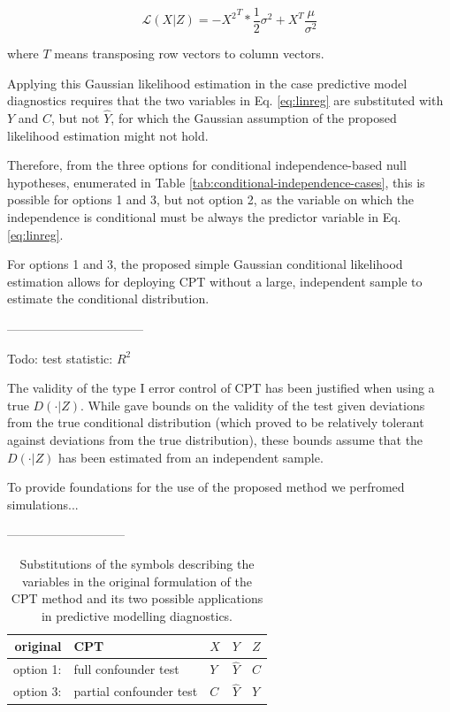 \documentclass{article}
\begin{document}
$$ \mathcal{L}(X|Z) = -{X^2}^T * \frac{1}{2} \sigma^2 + X^T \frac{\mu}{\sigma^2}$$

where $T$ means transposing row vectors to column vectors. 

Applying this Gaussian likelihood estimation in the case predictive model diagnostics requires that the two variables in Eq. \ref{eq:linreg} are substituted with $Y$ and $C$, but not $\hat{Y}$, for which the Gaussian assumption of the proposed likelihood estimation might not hold.

Therefore, from the three options for conditional independence-based null hypotheses, enumerated in Table \ref{tab:conditional-independence-cases}, this is possible for options 1 and 3, but not option 2, as the variable on which the independence is conditional must be always the predictor variable in Eq. \ref{eq:linreg}.

For options 1 and 3, the proposed simple Gaussian conditional likelihood estimation allows for deploying CPT without a large, independent sample to estimate the conditional distribution. 

---------------------------------


Todo: test statistic: $R^2$

The validity of the type I error control of CPT has been justified when using a true $D(\cdot|Z)$. While \cite{berrett2020conditional} gave bounds on the validity of the test given deviations from the true conditional distribution (which proved to be relatively tolerant against deviations from the true distribution), these bounds assume that the $D(\cdot|Z)$ has been estimated from an independent sample.

To provide foundations for the use of the proposed method we perfromed simulations...


-----------------------------

\renewcommand{\arraystretch}{2}
\begin{table}[]
\centering
\begin{tabular}{rl|l|l|l}
original & CPT & $X$ & $Y$ & $Z$ \\
\hline
option 1: & full confounder test & $Y$ & $\hat{Y}$ & $C$ \\
option 3: & partial confounder test & $C$ & $\hat{Y}$ & $Y$ \\
\end{tabular}
\caption{\label{tab:substitution} Substitutions of the symbols describing the variables in the original formulation of the CPT method and its two possible applications in predictive modelling diagnostics. }
\end{table}
\end{document}
